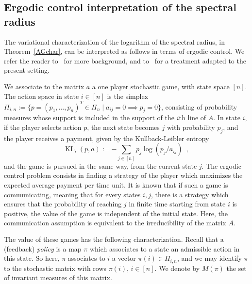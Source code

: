 \documentclass{amsart}
\newcommand{\0}{\mathbf{0}}
\newcommand{\1}{\mathbf{1}}
\theoremstyle{remark}
\numberwithin{equation}{section} %
\begin{document}
\subsection{Ergodic control interpretation of the spectral radius}
\label{subsec-ergodic}
%
The variational characterization of the logarithm of the spectral radius, in Theorem~\ref{AGchar}, can be interpreted as follows in terms of ergodic control. We refer
the reader to~\cite{whittle86} for more background, and to~\cite{AG03} for a treatment adapted to the present setting. 

We associate to the matrix $a$ a one player stochastic game, with
state space $[n]$. The action space in state $i\in [n]$
is the simplex $\Pi_{i,n}:= \{p=(p_1,\dots,p_n)^T\in \Pi_n\mid a_{ij}=0 \implies p_j =0\}$, consisting of probability measures whose support is included
in the support of the $i$th line of $A$. In state $i$, if the player
selects action $p$, the next state becomes $j$ with probability $p_j$,
and the player receives a payment, given by
the Kullback-Leibler entropy
\[
\operatorname{KL}_i(p,a):= - \sum_{j\in [n]} p_j \log (p_j/a_{ij}) \enspace ,
\]
and the game is pursued in the same way, from the current state $j$.
The ergodic control problem consists in finding a strategy of the player
which maximizes the expected average payment per time unit.
It is known that if such a game is communicating, meaning that
for every states $i,j$, there is a strategy which ensures that the
probability of reaching $j$ in finite time starting from state $i$ is positive,
the value of the game is independent of the initial state. Here,
the communication assumption is equivalent to the irreducibility
of the matrix $A$. 

The value of these games has the following characterization. Recall that a
(feedback) {\em policy} is a map $\pi$ which associates to a state an admissible action in this 
state. So here, $\pi$ associates to $i$ a vector $\pi(i)\in \Pi_{i,n}$, and
we may identify $\pi$ to the stochastic matrix with rows $\pi(i)$, $i\in [n]$.
We denote by $M(\pi)$ the set of invariant measures of this matrix.
\end{document}
